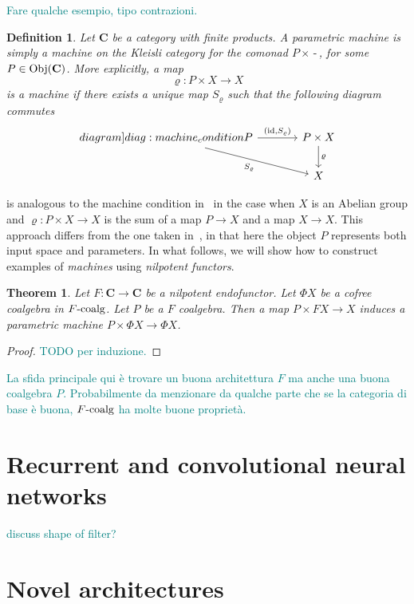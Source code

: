 \documentclass[12pt]{article}
\newtheorem{theorem}{Theorem}
\newtheorem{definition}{Definition}
\newcommand{\pietro}[1]{\textcolor{teal}{#1}}
\newcommand{\Obj}{{\textnormal{Obj}}}
\newcommand{\id}{{\textnormal{id}}}
\newcommand{\Cat}{{\mathbf{C}}}
\newcommand{\FCoalg}{{F\textnormal{-coalg}}}
\newcommand{\anon}{{\,\mbox{-}\,}}
\begin{document}
\pietro{Fare qualche esempio, tipo contrazioni.}

\begin{definition}\label{def:parametric_machine}
    Let $\Cat$ be a category with finite products. A {\em parametric machine} is simply a machine on the Kleisli category for the comonad $P \times \anon$, for some $P \in \Obj(\Cat)$. More explicitly, a map
    \begin{equation*}
        \varrho \colon P \times X \rightarrow X
    \end{equation*}
    is a {\em machine} if there exists a unique map $S_\varrho$ such that the following diagram commutes
    \begin{equation}
        \begin{tikzcd}[column sep=large]\label[diagram]{diag:machine_condition}
            P \arrow[rightarrow]{r}{\left(\id, S_\varrho\right)}
            \arrow[rightarrow,swap]{dr}{S_\varrho}
            & P \times X \arrow[rightarrow]{d}{\varrho} \\
            & X
        \end{tikzcd}
    \end{equation}
\end{definition}

 is analogous to the machine condition in~\cite{2020arXiv200702777V} in the case when $X$ is an Abelian group and $\varrho\colon P \times X \rightarrow X$ is the sum of a map $P \rightarrow X$ and a map $X \rightarrow X$. This approach differs from the one taken in~\cite{2020arXiv200702777V}, in that here the object $P$ represents both input space and parameters. In what follows, we will show how to construct examples of {\em machines} using {\em nilpotent functors}.

\begin{theorem}\label{thm:nilpotent_architecture}
    Let $F\colon \Cat \rightarrow \Cat$ be a nilpotent endofunctor. Let $\Phi X$ be a cofree coalgebra in $\FCoalg$. Let $P$ be a $F$ coalgebra. Then a map $P \times F X \rightarrow X$ induces a parametric machine $P \times \Phi X \rightarrow \Phi X$.
\end{theorem}

\begin{proof}
    \pietro{TODO per induzione.}
\end{proof}

\pietro{La sfida principale qui è trovare un buona architettura $F$ ma anche una buona coalgebra $P$. Probabilmente da menzionare da qualche parte che se la categoria di base è buona, $\FCoalg$ ha molte buone proprietà.}

\section{Recurrent and convolutional neural networks}

\pietro{discuss shape of filter?}

\section{Novel architectures}



\end{document}
